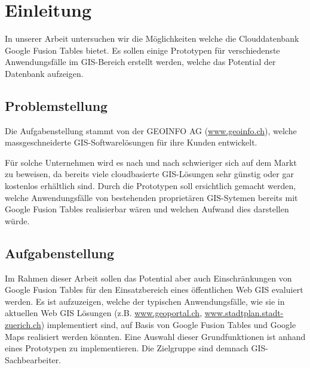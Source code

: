\chapter{Einleitung}
In unserer Arbeit untersuchen wir die Möglichkeiten welche die Clouddatenbank Google Fusion Tables bietet. Es sollen einige Prototypen für verschiedenste Anwendungsfälle im GIS-Bereich erstellt werden, welche das Potential der Datenbank aufzeigen.

\section{Problemstellung}
Die Aufgabenstellung stammt von der GEOINFO AG (\url{www.geoinfo.ch}), welche massgeschneiderte GIS-Softwarelösungen für ihre Kunden entwickelt.

Für solche Unternehmen wird es nach und nach schwieriger sich auf dem Markt zu beweisen, da bereits viele cloudbasierte GIS-Lösungen sehr günstig oder gar kostenlos erhältlich sind. Durch die Prototypen soll ersichtlich gemacht werden, welche Anwendungsfälle von bestehenden proprietären GIS-Sytemen bereits mit Google Fusion Tables realisierbar wären und welchen Aufwand dies darstellen würde.

\section{Aufgabenstellung}
Im Rahmen dieser Arbeit sollen das Potential aber auch Einschränkungen von Google Fusion Tables für den Einsatzbereich eines öffentlichen Web GIS evaluiert werden. Es ist aufzuzeigen, welche der typischen Anwendungsfälle, wie sie in aktuellen Web GIS Lösungen (z.B. \url{www.geoportal.ch}, \url{www.stadtplan.stadt-zuerich.ch}) implementiert sind, auf Basis von Google Fusion Tables und Google Maps realisiert werden könnten. Eine Auswahl dieser Grundfunktionen ist anhand eines Prototypen zu implementieren. Die Zielgruppe sind demnach GIS-Sachbearbeiter.

